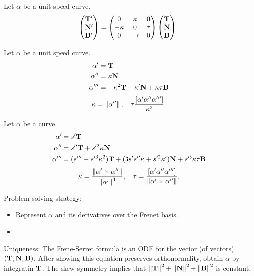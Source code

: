 \documentclass{article}
\begin{document}
\begin{thm}
Let $\alpha$ be a unit speed curve.
\[\begin{pmatrix}\mathbf{T}'\\\mathbf{N}'\\\mathbf{B}'\end{pmatrix}=\begin{pmatrix}0&\kappa&0\\-\kappa&0&\tau\\0&-\tau&0\end{pmatrix}\begin{pmatrix}\mathbf{T}\\\mathbf{N}\\\mathbf{B}\end{pmatrix}.\]
\end{thm}
\begin{thm}
Let $\alpha$ be a unit speed curve.
\begin{align*}
\alpha'&=\mathbf{T}\\
\alpha''&=\kappa\mathbf{N}\\
\alpha'''&=-\kappa^2\mathbf{T}+\kappa'\mathbf{N}+\kappa\tau\mathbf{B}
\end{align*}
\[\kappa=\left\lVert\alpha''\right\rVert,\quad\tau\frac{[\alpha'\alpha''\alpha''']}{\kappa^2}.\]
\end{thm}

\begin{thm}
Let $\alpha$ be a curve.
\begin{align*}
\alpha'&=s'\mathbf{T}\\
\alpha''&=s''\mathbf{T}+s'^2\kappa\mathbf{N}\\
\alpha'''&=(s'''-s'^3\kappa^2)\mathbf{T}+(3s's''\kappa+s'^2\kappa')\mathbf{N}+s'^3\kappa\tau\mathbf{B}
\end{align*}
\[\kappa=\frac{\left\lVert\alpha'\times\alpha''\right\rVert}{\left\lVert\alpha'\right\rVert^3},\quad\tau=\frac{[\alpha'\alpha''\alpha''']}{\left\lVert\alpha'\times\alpha''\right\rVert}.\]
\end{thm}

Problem solving strategy: 
\begin{itemize}
\item Represent $\alpha$ and its derivatives over the Frenet basis.
\item 
\end{itemize}

Uniqueness: The Frene-Serret formula is an ODE for the vector (of vectors) $(\mathbf{T},\mathbf{N},\mathbf{B})$.
After showing this equation preserves orthonormality, obtain $\alpha$ by integratin $\mathbf{T}$.
The skew-symmetry implies that $\left\lVert\mathbf{T}\right\rVert^2+\left\lVert\mathbf{N}\right\rVert^2+\left\lVert\mathbf{B}\right\rVert^2$ is constant.
\end{document}
